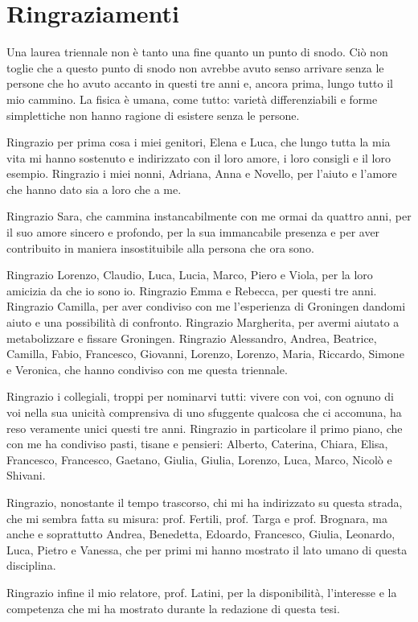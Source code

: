 \chapter*{Ringraziamenti} 
Una laurea triennale non è tanto una fine quanto un punto di snodo. Ciò non toglie che a questo punto di snodo non avrebbe avuto senso arrivare senza le persone che ho avuto accanto in questi tre anni e, ancora prima, lungo tutto il mio cammino. La fisica è umana, come tutto: varietà differenziabili e forme simplettiche non hanno ragione di esistere senza le persone.

Ringrazio per prima cosa i miei genitori, Elena e Luca, che lungo tutta la mia vita mi hanno sostenuto e indirizzato con il loro amore, i loro consigli e il loro esempio. Ringrazio i miei nonni, Adriana, Anna e Novello, per l'aiuto e l'amore che hanno dato sia a loro che a me.

Ringrazio Sara, che cammina instancabilmente con me ormai da quattro anni, per il suo amore sincero e profondo, per la sua immancabile presenza e per aver contribuito in maniera insostituibile alla persona che ora sono.

Ringrazio Lorenzo, Claudio, Luca, Lucia, Marco, Piero e Viola, per la loro amicizia da che io sono io. Ringrazio Emma e Rebecca, per questi tre anni. Ringrazio Camilla, per aver condiviso con me l'esperienza di Groningen dandomi aiuto e una possibilità di confronto. Ringrazio Margherita, per avermi aiutato a metabolizzare e fissare Groningen. Ringrazio Alessandro, Andrea, Beatrice, Camilla, Fabio, Francesco, Giovanni, Lorenzo, Lorenzo, Maria, Riccardo, Simone e Veronica, che hanno condiviso con me questa triennale.

Ringrazio i collegiali, troppi per nominarvi tutti: vivere con voi, con ognuno di voi nella sua unicità comprensiva di uno sfuggente qualcosa che ci accomuna, ha reso veramente unici questi tre anni. Ringrazio in particolare il primo piano, che con me ha condiviso pasti, tisane e pensieri: Alberto, Caterina, Chiara, Elisa, Francesco, Francesco, Gaetano, Giulia, Giulia, Lorenzo, Luca, Marco, Nicolò e Shivani.

Ringrazio, nonostante il tempo trascorso, chi mi ha indirizzato su questa strada, che mi sembra fatta su misura: prof. Fertili, prof. Targa e prof. Brognara, ma anche e soprattutto Andrea, Benedetta, Edoardo, Francesco, Giulia, Leonardo, Luca, Pietro e Vanessa, che per primi mi hanno mostrato il lato umano di questa disciplina.

Ringrazio infine il mio relatore, prof. Latini, per la disponibilità, l'interesse e la competenza che mi ha mostrato durante la redazione di questa tesi.